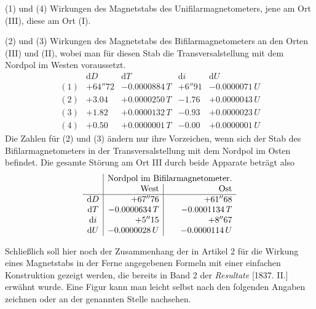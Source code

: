 (1) und (4) Wirkungen des Magnetstabs des Unifilarmagnetometers, jene am Ort (III), diese am Ort (I).

(2) und (3) Wirkungen des Magnetstabs des Bifilarmagnetometers an den Orten (III) und (II), wobei man für diesen Stab die Transversalstellung mit dem Nordpol im Westen voraussetzt.
\[
\begin{array}{c|r|r|r|r}
&\mathrm{d}D&\mathrm{d}T&\mathrm{d}i&\mathrm{d}U\\\hline
(1)&+64''72&-0.0000884\,T&+6''91&-0.0000071\,U\\
(2)&+3.04&+0.0000250\,T&-1.76&+0.0000043\,U\\
(3)&+1.82&+0.0000132\,T&-0.93&+0.0000023\,U\\
(4)&+0.50&+0.0000001\,T&-0.00&+0.0000001\,U
\end{array}
\]
Die Zahlen für (2) und (3) ändern nur ihre Vorzeichen, wenn sich der Stab des Bifilarmagnetometers in der Transversalstellung mit dem Nordpol im Osten befindet. Die gesamte Störung am Ort III durch beide Apparate beträgt also
\[
\begin{array}{c|r|r}
&\multicolumn{2}{c}{\text{Nordpol im Bifilarmagnetometer.}}\\
&\text{West}&\text{Ost}\\\hline
\mathrm{d}D&+67''76&+61''68\\
\mathrm{d}T&-0.0000634\,T&-0.0001134\,T\\
\mathrm{d}i&+5''15&+8''67\\
\mathrm{d}U&-0.0000028\,U&-0.0000114\,U
\end{array}
\]

Schließlich soll hier noch der Zusammenhang der in Artikel 2 für die Wirkung eines Magnetstabs in der Ferne angegebenen Formeln mit einer einfachen Konstruktion gezeigt werden, die bereits in Band 2 der \textit{Resultate} [1837. II.] erwähnt wurde. Eine Figur kann man leicht selbst nach den folgenden Angaben zeichnen oder an der genannten Stelle nachsehen.

